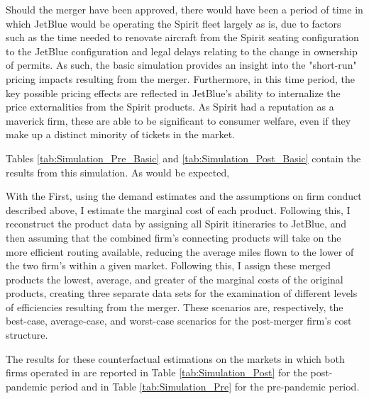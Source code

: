 \documentclass{article}
\begin{document}
	 Should the merger have been approved, there would have been a period of time in which JetBlue would be operating the Spirit fleet largely as is, due to factors such as the time needed to renovate aircraft from the Spirit seating configuration to the JetBlue configuration and legal delays relating to the change in ownership of permits. As such, the basic simulation provides an insight into the "short-run" pricing impacts resulting from the merger. Furthermore, in this time period, the key possible pricing effects are reflected in JetBlue's ability to internalize the price externalities from the Spirit products. As Spirit had a reputation as a maverick firm, these are able to be significant to consumer welfare, even if they make up a distinct minority of tickets in the market.
	 
	 Tables \ref{tab:Simulation_Pre_Basic} and \ref{tab:Simulation_Post_Basic} contain the results from this simulation. As would be expected, 
	
	With the First, using the demand estimates and the assumptions on firm conduct described above, I estimate the marginal cost of each product. Following this, I reconstruct the product data by assigning all Spirit itineraries to JetBlue, and then assuming that the combined firm's connecting products will take on the more efficient routing available, reducing the average miles flown to the lower of the two firm's within a given market. Following this, I assign these merged products the lowest, average, and greater of the marginal costs of the original products, creating three separate data sets for the examination of different levels of efficiencies resulting from the merger. These scenarios are, respectively, the best-case, average-case, and worst-case scenarios for the post-merger firm's cost structure.  
	
	The results for these counterfactual estimations on the markets in which both firms operated in are reported in Table \ref{tab:Simulation_Post} for the post-pandemic period and in Table \ref{tab:Simulation_Pre} for the pre-pandemic period. 
	
	
\end{document}
